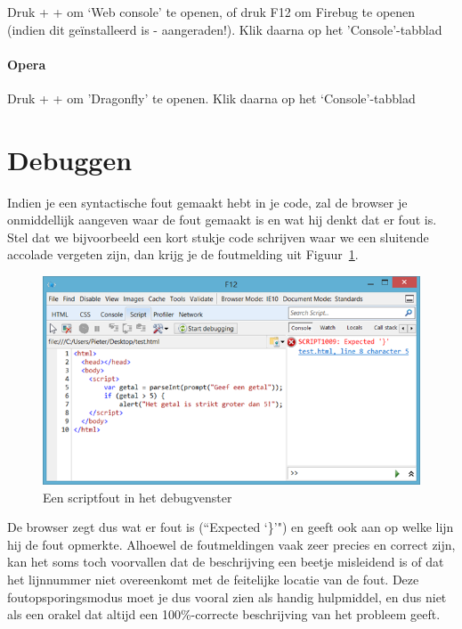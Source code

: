 Druk  +  +  om `Web console' te openen, of druk F12 om Firebug te openen (indien dit ge\"installeerd is - aangeraden!). Klik daarna op het 'Console'-tabblad

\paragraph{Opera}

Druk  +  +  om 'Dragonfly' te openen. Klik daarna op het `Console'-tabblad

\section{Debuggen}

Indien je een syntactische fout gemaakt hebt in je code, zal de browser je onmiddellijk aangeven waar de fout gemaakt is en wat hij denkt dat er fout is. Stel dat we bijvoorbeeld een kort stukje code schrijven waar we een sluitende accolade vergeten zijn, dan krijg je de foutmelding uit Figuur~\ref{fig:debug1}.

\begin{figure}
\centering
\includegraphics[scale=0.8]{Debuggen/debug1.png}
\caption{Een scriptfout in het debugvenster}\label{fig:debug1}
\end{figure}

De browser zegt dus wat er fout is (``Expected `\}'") en geeft ook aan op welke lijn hij de fout opmerkte. Alhoewel de foutmeldingen vaak zeer precies en correct zijn, kan het soms toch voorvallen dat de beschrijving een beetje misleidend is of dat het lijnnummer niet overeenkomt met de feitelijke locatie van de fout. Deze foutopsporingsmodus moet je dus vooral zien als handig hulpmiddel, en dus niet als een orakel dat altijd een 100\%-correcte beschrijving van het probleem geeft.

